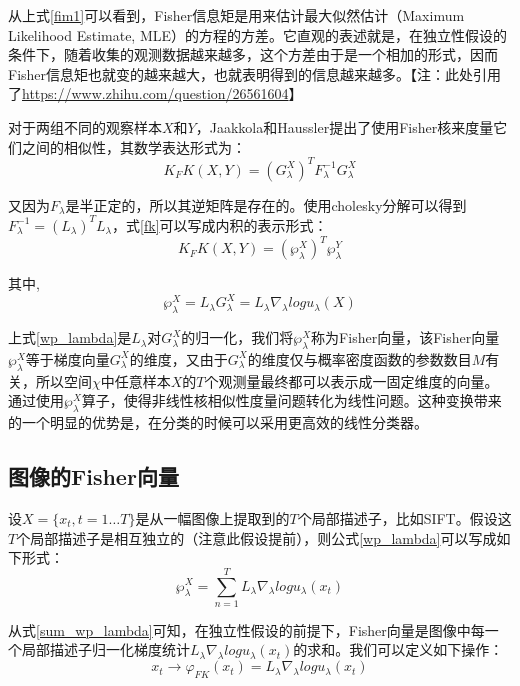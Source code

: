 \documentclass[color=cyan,mathpazo,titlestyle=hang]{elegantbook}
\begin{document}
从上式\eqref{fim1}可以看到，Fisher信息矩是用来估计最大似然估计（Maximum Likelihood Estimate, MLE）的方程的方差。它直观的表述就是，在独立性假设的条件下，随着收集的观测数据越来越多，这个方差由于是一个相加的形式，因而Fisher信息矩也就变的越来越大，也就表明得到的信息越来越多。【注：此处引用了\href{fisher information 的直观意义是什么？}{https://www.zhihu.com/question/26561604}】

对于两组不同的观察样本$X$和$Y$，Jaakkola和Haussler提出了使用Fisher核来度量它们之间的相似性，其数学表达形式为：
\begin{equation}
K_FK(X, Y) = (G^X_\lambda)^T F_\lambda^{-1} G^X_\lambda
\label{fk}
\end{equation}

又因为$F_{\lambda}$是半正定的，所以其逆矩阵是存在的。使用cholesky分解可以得到$F_\lambda^{-1} = (L_\lambda)^T L_\lambda$，式\eqref{fk}可以写成内积的表示形式：
\begin{equation}
K_FK(X, Y) = (\wp^X_\lambda)^T \wp^Y_\lambda
\label{fk1}
\end{equation}

其中,
\begin{equation}
\wp^X_\lambda = L_\lambda G^X_\lambda = L_\lambda \nabla_\lambda log u_\lambda(X)
\label{wp_lambda}
\end{equation}

上式\eqref{wp_lambda}是$L_\lambda$对$G^X_\lambda$的归一化，我们将$\wp^X_\lambda$称为Fisher向量，该Fisher向量$\wp^X_\lambda$等于梯度向量$G^X_\lambda$的维度，又由于$G^X_\lambda$的维度仅与概率密度函数的参数数目$M$有关，所以空间$\chi$中任意样本$X$的$T$个观测量最终都可以表示成一固定维度的向量。通过使用$\wp^X_\lambda$算子，使得非线性核相似性度量问题转化为线性问题。这种变换带来的一个明显的优势是，在分类的时候可以采用更高效的线性分类器。

\subsection{图像的Fisher向量}

设$X = \lbrace x_t, t=1 \dots T \rbrace$是从一幅图像上提取到的$T$个局部描述子，比如SIFT。假设这$T$个局部描述子是相互独立的（注意此假设提前），则公式\eqref{wp_lambda}可以写成如下形式：
\begin{equation}
\wp^X_\lambda = \sum_{n=1}^{T} L_\lambda \nabla_\lambda log u_\lambda(x_t)
\label{sum_wp_lambda}
\end{equation}

从式\eqref{sum_wp_lambda}可知，在独立性假设的前提下，Fisher向量是图像中每一个局部描述子归一化梯度统计$L_\lambda \nabla_\lambda log u_\lambda(x_t)$的求和。我们可以定义如下操作：
\begin{equation}
x_t \longrightarrow \varphi_{FK}(x_t) = L_\lambda \nabla_\lambda log u_\lambda(x_t)
\label{operator_wp_lambda}
\end{equation}
\end{document}
